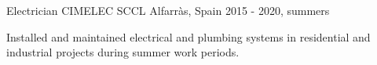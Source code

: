 \cventry
  {Electrician}
  {CIMELEC SCCL}
  {Alfarr\`as, Spain}
  {2015 - 2020, summers}
  {
    \begin{cvitems}
      \item {Installed and maintained electrical and plumbing systems in residential and industrial projects during summer work periods.}
    \end{cvitems}
  }
